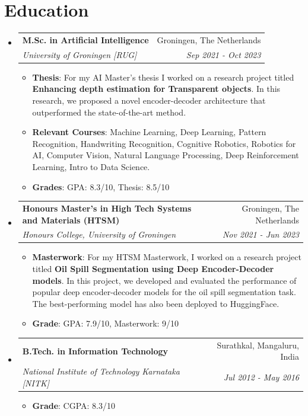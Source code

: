 \documentclass[letterpaper, 10pt]{article}
\makeatletter
\newcommand{\resumeItem}[2]{
    \item\small{
        \textbf{#1}{: #2 \vspace{-2pt}}
    }
}
\newcommand{\resumeSubheading}[4]{
    \vspace{-1pt}\item
    \begin{tabular*}{0.97\textwidth}{l@{\extracolsep{\fill}}r}
        \textbf{#1} & #2 \\
        \textit{\small#3} & \textit{\small #4} \\
    \end{tabular*}\vspace{-5pt}
}
\newcommand{\resumeSubHeadingListStart}{\begin{itemize}[leftmargin=*]}
\newcommand{\resumeSubHeadingListEnd}{\end{itemize}\vspace{-5pt}}
\makeatother
\begin{document}
\section{Education}
    \resumeSubHeadingListStart
        \resumeSubheading
            {M.Sc. in Artificial Intelligence}{Groningen, The Netherlands}
            {University of Groningen [RUG]}{Sep 2021 - Oct 2023}
            \resumeSubHeadingListStart
                \resumeItem{Thesis}{For my AI Master's thesis I worked on a research project titled \textbf{Enhancing depth estimation for Transparent objects}. In this research, we proposed a novel encoder-decoder architecture that outperformed the state-of-the-art method.}
                \resumeItem{Relevant Courses}{Machine Learning, Deep Learning, Pattern Recognition, Handwriting Recognition, Cognitive Robotics, Robotics for AI, Computer Vision, Natural Language Processing, Deep Reinforcement Learning, Intro to Data Science.}
                \resumeItem{Grades}{GPA: 8.3/10, Thesis: 8.5/10}
            \resumeSubHeadingListEnd

        \resumeSubheading
            {Honours Master's in High Tech Systems and Materials (HTSM)}{Groningen, The Netherlands}
            {Honours College, University of Groningen}{Nov 2021 - Jun 2023}
            \resumeSubHeadingListStart
                \resumeItem{Masterwork}{For my HTSM Masterwork, I worked on a research project titled \textbf{Oil Spill Segmentation using Deep Encoder-Decoder models}. In this project, we developed and evaluated the performance of popular deep encoder-decoder models for the oil spill segmentation task. The best-performing model has also been deployed to HuggingFace.}
                \resumeItem{Grade}{GPA: 7.9/10, Masterwork: 9/10}
            \resumeSubHeadingListEnd
        
        \resumeSubheading
            {B.Tech. in Information Technology}{Surathkal, Mangaluru,  India}
            {National Institute of Technology Karnataka [NITK]}{Jul 2012 - May 2016}
            \resumeSubHeadingListStart
                \resumeItem{Grade}{CGPA: 8.3/10}
            \resumeSubHeadingListEnd
    \resumeSubHeadingListEnd
\end{document}
